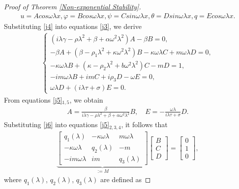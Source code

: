 \documentclass[11pt,reqno]{article}
\begin{document}
\begin{proof}[Proof of Theorem \ref{Non-exponential Stability}]
  	\begin{align}\label{j4}
  		u=Acos\omega\lambda x, \varphi=Bcos\omega\lambda x, \psi=Csin\omega\lambda x, \theta=Dsin\omega\lambda x, q=Ecos\omega\lambda x.
  	\end{align}
  	Substituting \eqref{j4} into equations \eqref{j3}, we derive
  	\begin{align}\label{j5}
  		\begin{cases}
  			(i \lambda \gamma - \rho \lambda^2 + \beta + \alpha \omega^2 \lambda^2) A - \beta B = 0, \\
  			-\beta A + (\beta - \rho_1 \lambda^2 + \kappa \omega^2 \lambda^2) B - \kappa \omega \lambda C + m \omega \lambda D = 0, \\
  			-\kappa \omega \lambda B + (\kappa - \rho_2 \lambda^2 + b \omega^2 \lambda^2) C - m D = 1, \\
  			-im \omega \lambda B + im C + i \rho_3 D - \omega E = 0, \\
  			\omega \lambda D + (i \lambda \tau + \sigma) E = 0.
  		\end{cases}
  	\end{align}
  	From equations \eqref{j5}$_{1,5}$, we obtain
  	\begin{align}\label{j6}
  		A=\frac{\beta}{i \lambda \gamma - \rho \lambda^2 + \beta + \alpha \omega^2 \lambda^2}B, \quad E=-\frac{\omega \lambda}{i \lambda \tau + \sigma}D.
  	\end{align}
  	Substituting \eqref{j6} into equations \eqref{j5}$_{2,3,4}$, it follows that
  	\begin{align}
  		\underbrace{
  			\left[ \begin{array}{ccc}
  				q_{1}(\lambda) & -\kappa\omega\lambda & m\omega\lambda \\
  				-\kappa\omega\lambda & q_{2}(\lambda) & -m \\
  				-im\omega\lambda & im & q_{3}(\lambda)
  			\end{array} \right]
  		}_{:=M}
  		\left[ \begin{array}{c}
  			B \\
  			C \\
  			D
  		\end{array} \right]
  		=
  		\left[ \begin{array}{c}
  			0 \\
  			1 \\
  			0
  		\end{array} \right],
  	\end{align}
  	where $q_1(\lambda)$, $q_2(\lambda)$, $q_3(\lambda)$ are defined as

\end{proof}
\end{document}
